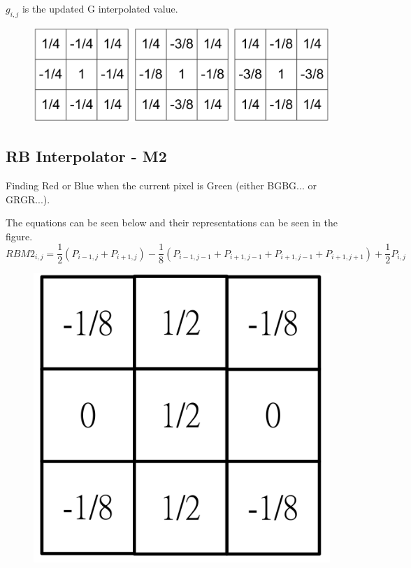 \documentclass{article}
\begin{document}
$g_{i,j}$ is the updated G interpolated value.

\begin{figure}[H]
    \centering
    \includegraphics[scale=0.3]{DocResources/RBM1.png}
\end{figure}





\subsection{RB Interpolator - M2}
Finding Red or Blue when the current pixel is Green (either BGBG... or GRGR...).

The equations can be seen below and their representations can be seen in the figure.
    {
        \begin{equation}
            RBM2_{i,j} = \frac{1}{2}(P_{i-1,j} + P_{i+1,j}) - \frac{1}{8}(P_{i-1,j-1} + P_{i+1,j-1} + P_{i+1,j-1} + P_{i+1,j+1}) + \frac{1}{2}P_{i,j}
        \end{equation}
    }


\begin{figure}[H]
    \centering
    \includegraphics[scale=0.3]{DocResources/RBM2.png}
\end{figure}
\end{document}
